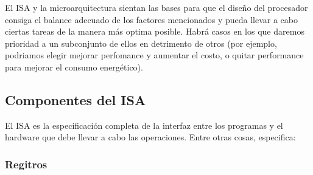 El ISA y la microarquitectura sientan las bases para que el diseño del procesador consiga el balance adecuado de los factores mencionados y pueda llevar a cabo ciertas tareas de la manera más optima posible. Habrá casos en los que daremos prioridad a un subconjunto de ellos en detrimento de otros (por ejemplo, podriamos elegir mejorar perfomance y aumentar el costo, o quitar performance para mejorar el consumo energético).

\subsection{Componentes del ISA}
El ISA es la especificación completa de la interfaz entre los programas y el hardware que debe llevar a cabo las operaciones. Entre otras cosas, especifica:

\subsubsection{Regitros}
